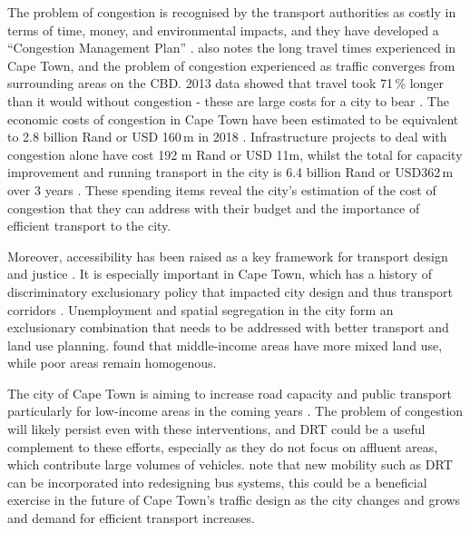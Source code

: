 \documentclass[main.tex]{subfiles}
\begin{document}
The problem of congestion is recognised by the transport authorities as costly in terms of time, money, and environmental impacts, and they have developed a “Congestion Management Plan” \citep{TDCIP}. \citealp{jennings2015finding} also notes the long travel times experienced in Cape Town, and the problem of congestion experienced as traffic converges from surrounding areas on the CBD. 2013 data showed that travel took 71\,\% longer than it would without congestion - these are large costs for a city to bear \citep{TDA}. The economic costs of congestion in Cape Town have been estimated to be equivalent to 2.8 billion Rand or USD 160\,m in 2018 \citep{IOL}. Infrastructure projects to deal with congestion alone have cost 192 m Rand or USD 11m, whilst  the total for capacity improvement and running transport in the city is 6.4 billion Rand or USD362\,m over 3 years \citep{TCT}. These spending items reveal the city's estimation of the cost of congestion that they can address with their budget and the importance of efficient transport to the city.
 
Moreover, accessibility has been raised as a key framework for transport design and justice \citep{Access}. It is especially important in Cape Town, which has a history of discriminatory exclusionary policy that impacted city design and thus transport corridors \citep{Liphoto2025}. Unemployment and spatial segregation in the city form an exclusionary combination that needs to be addressed with better transport and land use planning. \citealp{Moyo} found that middle-income areas have more mixed land use, while poor areas remain homogenous. 

The city of Cape Town is aiming to increase road capacity and public transport particularly for low-income areas in the coming years \citep{IDP}. The problem of congestion will likely persist even with these interventions, and DRT could be a useful complement to these efforts, especially as they do not focus on affluent areas, which contribute large volumes of vehicles. \citealp{byala2021redesigning} note that new mobility such as DRT can be incorporated into redesigning bus systems, this could be a beneficial exercise in the future of Cape Town’s traffic design as the city changes and grows and demand for efficient transport increases.
\end{document}
